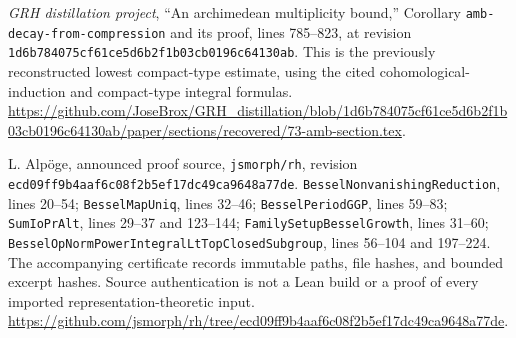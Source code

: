 \emph{GRH distillation project},
``An archimedean multiplicity bound,'' Corollary
\texttt{amb-decay-from-compression} and its proof, lines 785--823,
at revision \texttt{1d6b784075cf61ce5d6b2f1b03cb0196c64130ab}.
This is the previously reconstructed lowest compact-type estimate,
using the cited cohomological-induction and compact-type integral
formulas.
\url{https://github.com/JoseBrox/GRH_distillation/blob/1d6b784075cf61ce5d6b2f1b03cb0196c64130ab/paper/sections/recovered/73-amb-section.tex}.

L. Alp\"oge, announced proof source, \texttt{jsmorph/rh}, revision
\texttt{ecd09ff9b4aaf6c08f2b5ef17dc49ca9648a77de}.
\texttt{BesselNonvanishingReduction}, lines 20--54;
\texttt{BesselMapUniq}, lines 32--46;
\texttt{BesselPeriodGGP}, lines 59--83;
\texttt{SumIoPrAlt}, lines 29--37 and 123--144;
\texttt{FamilySetupBesselGrowth}, lines 31--60;
\texttt{BesselOpNormPowerIntegralLtTopClosedSubgroup},
lines 56--104 and 197--224.
The accompanying certificate records immutable paths, file hashes,
and bounded excerpt hashes.  Source authentication is not a Lean
build or a proof of every imported representation-theoretic input.
\url{https://github.com/jsmorph/rh/tree/ecd09ff9b4aaf6c08f2b5ef17dc49ca9648a77de}.
